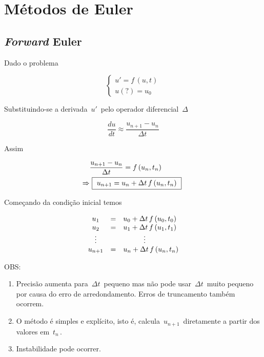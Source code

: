 \section{Métodos de Euler}

\subsection{\textit{Forward} Euler}

Dado o problema

\begin{equation}
 \label{cap6:sec2:eq1}
 \left\{
  \begin{array}{l}
   u' = f \, (u, t) \\
   u(?) = u_0
  \end{array}
 \right.
\end{equation}

Substituindo-se a derivada $ \, u' \, $ pelo operador diferencial $ \, \Delta \, $

\begin{equation}
 \label{cap6:sec2:eq2}
 \frac{du}{dt} \approx \frac{u_{n+1} - u_n}{\Delta t}
\end{equation}

Assim

\begin{eqnarray}
 \label{cap6:sec2:eq3}
              & \displaystyle \frac{u_{n+1} - u_n}{\Delta t} = f \, (u_n, t_n) \nonumber
  \vspace*{0.2cm} \\
  \Rightarrow & \mbox{ \framebox{ $ u_{n+1} = u_n + \Delta t \, f \, (u_n, t_n) $ } }
\end{eqnarray}

Começando da condição inicial temos

\begin{equation}
 \label{cap6:sec2:eq4}
 \begin{array}{cll}
  u_1     & = & u_0 + \Delta t \, f \, (u_0, t_0) \\
  u_2     & = & u_1 + \Delta t \, f \, (u_1, t_1) \\
  \vdots  &   & \hspace*{1cm} \vdots \\
  u_{n+1} & = & u_n + \Delta t \, f \, (u_n, t_n)
 \end{array}
\end{equation}

OBS:

\begin{enumerate}

\item Precisão aumenta para $ \, \Delta t \, $ pequeno mas não pode usar $ \, \Delta t \, $ muito pequeno por causa do erro de arredondamento. Erros de truncamento também ocorrem.

\item O método é simples e explícito, isto é, calcula $ \, u_{n+1} \, $ diretamente a partir dos valores em $ \, t_n \, $.

\item Instabilidade pode ocorrer.

\end{enumerate}

